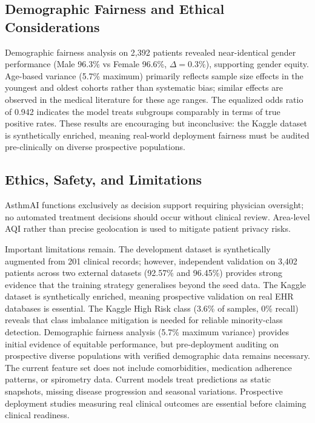 \documentclass[11pt,a4paper]{article}
\begin{document}
\subsection{Demographic Fairness and Ethical Considerations}

Demographic fairness analysis on 2,392 patients revealed near-identical gender
performance (Male 96.3\% vs Female 96.6\%, $\Delta = 0.3\%$), supporting gender
equity. Age-based variance (5.7\% maximum) primarily reflects sample size effects
in the youngest and oldest cohorts rather than systematic bias; similar effects are
observed in the medical literature for these age ranges. The equalized odds ratio
of 0.942 indicates the model treats subgroups comparably in terms of true positive
rates. These results are encouraging but inconclusive: the Kaggle dataset is
synthetically enriched, meaning real-world deployment fairness must be audited
pre-clinically on diverse prospective populations.

\subsection{Ethics, Safety, and Limitations}

AsthmAI functions exclusively as decision support requiring physician oversight; no
automated treatment decisions should occur without clinical review. Area-level AQI
rather than precise geolocation is used to mitigate patient privacy risks.

Important limitations remain. The development dataset is synthetically augmented from
201 clinical records; however, independent validation on 3,402 patients across two
external datasets (92.57\% and 96.45\%) provides strong evidence that the training
strategy generalises beyond the seed data. The Kaggle dataset is synthetically enriched,
meaning prospective validation on real EHR databases is essential. The Kaggle High Risk class (3.6\% of
samples, 0\% recall) reveals that class imbalance mitigation is needed for reliable
minority-class detection. Demographic fairness analysis (5.7\% maximum variance)
provides initial evidence of equitable performance, but pre-deployment auditing on
prospective diverse populations with verified demographic data remains necessary.
The current feature set does not include comorbidities, medication adherence patterns,
or spirometry data. Current models treat predictions as static snapshots, missing
disease progression and seasonal variations. Prospective deployment studies measuring
real clinical outcomes are essential before claiming clinical readiness.
\end{document}

